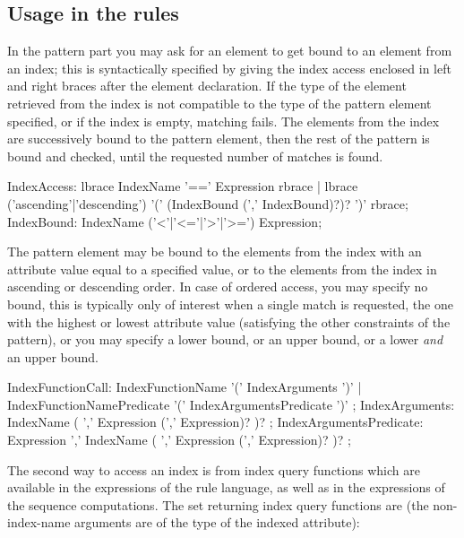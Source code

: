 \subsection*{Usage in the rules}\label{sub:indexusage}

In the pattern part you may ask for an element to get bound to an element from an index;
this is syntactically specified by giving the index access enclosed in left and right braces after the element declaration.
If the type of the element retrieved from the index is not compatible to the type of the pattern element specified,
or if the index is empty, matching fails.
The elements from the index are successively bound to the pattern element, then the rest of the pattern is bound and checked, until the requested number of matches is found.

\begin{rail}
  IndexAccess:
    lbrace IndexName '==' Expression rbrace |
		lbrace ('ascending'|'descending') '(' (IndexBound (',' IndexBound)?)? ')' rbrace;
	IndexBound: IndexName ('<'|'<='|'>'|'>=') Expression;
\end{rail}

The pattern element may be bound to the elements from the index with an attribute value equal to a specified value,
or to the elements from the index in ascending or descending order.
In case of ordered access, you may specify no bound, this is typically only of interest when a single match is requested, the one with the highest or lowest attribute value (satisfying the other constraints of the pattern), or you may specify a lower bound, or an upper bound, or a lower \emph{and} an upper bound.

\begin{rail}
  IndexFunctionCall:
    IndexFunctionName '(' IndexArguments ')' |
    IndexFunctionNamePredicate '(' IndexArgumentsPredicate ')' ;
  IndexArguments: 
    IndexName ( ',' Expression (',' Expression)? )? ;
  IndexArgumentsPredicate: 
    Expression ',' IndexName ( ',' Expression (',' Expression)? )? ;
\end{rail}

The second way to access an index is from index query functions which are available in the expressions of the rule language, as well as in the expressions of the sequence computations.
The set returning index query functions are (the non-index-name arguments are of the type of the indexed attribute):

